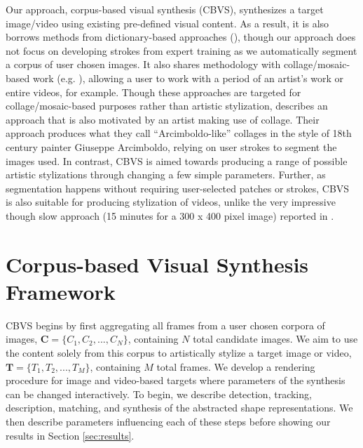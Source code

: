 \documentclass[a4paper,10pt,final]{ThesisStyle}
\begin{document}
Our approach, corpus-based visual synthesis (CBVS), synthesizes a target image/video using existing pre-defined visual content.  As a result, it is also borrows methods from dictionary-based approaches (\cite{Zeng2009,Healey2004}), though our approach does not focus on developing strokes from expert training as we automatically segment a corpus of user chosen images.  It also shares methodology with collage/mosaic-based work (e.g. \cite{Kim2002,Orchard2008,Huang2011a,Miller2012}), allowing a user to work with a period of an artist's work or entire videos, for example.  Though these approaches are targeted for collage/mosaic-based purposes rather than artistic stylization, \cite{Huang2011a} describes an approach that is also motivated by an artist making use of collage.  Their approach produces what they call ``Arcimboldo-like'' collages in the style of 18th century painter Giuseppe Arcimboldo, relying on user strokes to segment the images used.  In contrast, CBVS is aimed towards producing a range of possible artistic stylizations through changing a few simple parameters.  Further, as segmentation happens without requiring user-selected patches or strokes, CBVS is also suitable for producing stylization of videos, unlike the very impressive though slow approach (15 minutes for a 300 x 400 pixel image) reported in \cite{Chang2010}.
\section{Corpus-based Visual Synthesis Framework}  
CBVS begins by first aggregating all frames from a user chosen corpora of images, $\mathbf{C} = \{C_1, C_2, ..., C_N\}$, containing $N$ total candidate images.  We aim to use the content solely from this corpus to artistically stylize a target image or video, $\mathbf{T} = \{T_1, T_2, ..., T_M\}$, containing $M$ total frames.  We develop a rendering procedure for image and video-based targets where parameters of the synthesis can be changed interactively.  To begin, we describe detection, tracking, description, matching, and synthesis of the abstracted shape representations.  We then describe parameters influencing each of these steps before showing our results in Section \ref{sec:results}.
\end{document}

